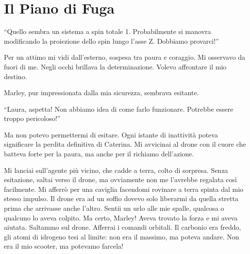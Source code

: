 \section{Il Piano di Fuga}

\begin{dialogue}
 \enquote{Quello sembra un sistema a spin totale 1. Probabilmente si manovra modificando la proiezione dello spin lungo l’asse Z. Dobbiamo provarci!}
\end{dialogue}

Per un attimo mi vidi dall'esterno, sospesa tra paura e coraggio. Mi osservavo da fuori di me. Negli occhi brillava la determinazione. Volevo affrontare il mio destino.


Marley, pur impressionata dalla mia sicurezza, sembrava esitante.

\begin{dialogue}
 \enquote{Laura, aspetta! Non abbiamo idea di come farlo funzionare. Potrebbe essere troppo pericoloso!}
\end{dialogue}

Ma non potevo permettermi di esitare. Ogni istante di inattività poteva significare la perdita definitiva di Caterina. Mi avvicinai al drone con il cuore che batteva forte per la paura, ma anche per il richiamo dell'azione.

Mi lanciai sull'agente più vicino, che cadde a terra, colto di sorpresa. Senza esitazione, saltai verso il drone, ma ovviamente non me l'avrebbe regalata così facilmente. Mi afferrò per una caviglia facendomi rovinare a terra spinta dal mio stesso impulso. Il drone era ad un soffio dovevo solo liberarmi da quella stretta prima che arrivasse anche l'altro. Sentii un urlo alle mie spalle, qualcosa o qualcuno lo aveva colpito. Ma certo, Marley! Aveva trovato la forza e mi aveva aiutata. Saltammo  sul drone.  Afferrai i comandi orbitali. Il carbonio era freddo, gli atomi di idrogeno tesi al limite: non era il massimo, ma poteva andare. Non era il mio scooter, ma potevamo farcela!




